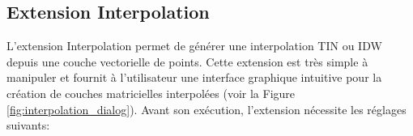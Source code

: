 
\subsection{Extension Interpolation}


L'extension Interpolation permet de générer une interpolation TIN ou IDW 
depuis une couche vectorielle de points. Cette extension est très simple à 
manipuler et fournit à l'utilisateur une interface graphique intuitive pour la
création de couches matricielles interpolées (voir la Figure \ref{fig:interpolation_dialog}).
Avant son exécution, l'extension nécessite les réglages suivants:

